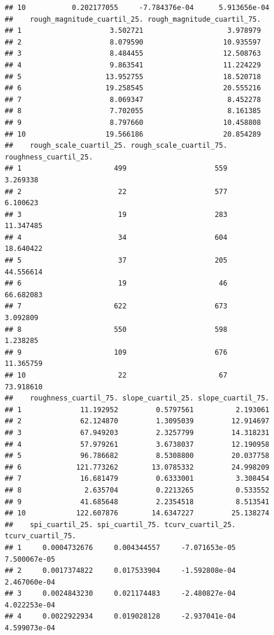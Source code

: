 \documentclass[11pt,]{article}
\begin{document}
\begin{verbatim}
## 10           0.202177055     -7.784376e-04      5.913656e-04
##    rough_magnitude_cuartil_25. rough_magnitude_cuartil_75.
## 1                     3.502721                    3.978979
## 2                     8.079590                   10.935597
## 3                     8.484455                   12.508763
## 4                     9.863541                   11.224229
## 5                    13.952755                   18.520718
## 6                    19.258545                   20.555216
## 7                     8.069347                    8.452278
## 8                     7.702055                    8.161385
## 9                     8.797660                   10.458808
## 10                   19.566186                   20.854289
##    rough_scale_cuartil_25. rough_scale_cuartil_75. roughness_cuartil_25.
## 1                      499                     559              3.269338
## 2                       22                     577              6.100623
## 3                       19                     283             11.347485
## 4                       34                     604             18.640422
## 5                       37                     205             44.556614
## 6                       19                      46             66.682083
## 7                      622                     673              3.092809
## 8                      550                     598              1.238285
## 9                      109                     676             11.365759
## 10                      22                      67             73.918610
##    roughness_cuartil_75. slope_cuartil_25. slope_cuartil_75.
## 1              11.192952         0.5797561          2.193061
## 2              62.124870         1.3095039         12.914697
## 3              67.949203         2.3257799         14.318231
## 4              57.979261         3.6738037         12.190958
## 5              96.786682         8.5308800         20.037758
## 6             121.773262        13.0785332         24.998209
## 7              16.681479         0.6333001          3.308454
## 8               2.635704         0.2213265          0.533552
## 9              41.685648         2.2354518          8.513541
## 10            122.607876        14.6347227         25.138274
##    spi_cuartil_25. spi_cuartil_75. tcurv_cuartil_25. tcurv_cuartil_75.
## 1     0.0004732676     0.004344557     -7.071653e-05      7.500067e-05
## 2     0.0017374822     0.017533904     -1.592808e-04      2.467060e-04
## 3     0.0024843230     0.021174483     -2.480827e-04      4.022253e-04
## 4     0.0022922934     0.019028128     -2.937041e-04      4.599073e-04

\end{verbatim}
\end{document}
